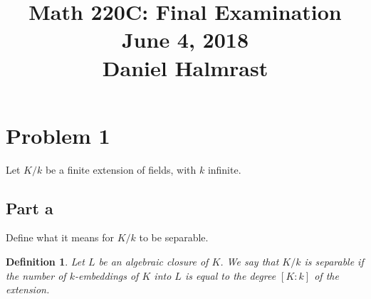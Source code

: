 \documentclass[12pt,reqno]{amsart}
\newtheorem*{defn}{Definition}
\begin{document}
\title[]{Math 220C: Final Examination\\June 4, 2018\\Daniel Halmrast}
\maketitle
\large

\section*{Problem 1}
Let $K/k$ be a finite extension of fields, with $k$ infinite.

\subsection*{Part a}
Define what it means for $K/k$ to be separable.

\begin{defn}
    Let $L$ be an algebraic closure of $K$. We say that $K/k$ is separable if
    the number of $k$-embeddings of $K$ into $L$ is equal to the degree $[K:k]$
    of the extension.
\end{defn}
\end{document}
